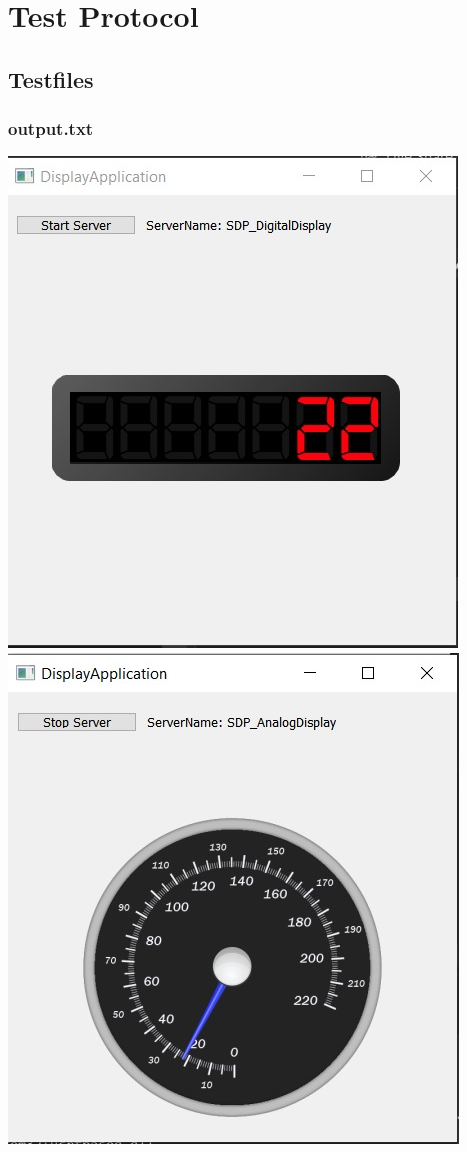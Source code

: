 \newpage
\section{Test Protocol}

\subsection{Testfiles}
\subsubsection{output.txt}

\includegraphics[scale=0.55]{DigitalDisplay.jpeg}
\includegraphics[scale=0.55]{AnalogDisplay.jpeg}

